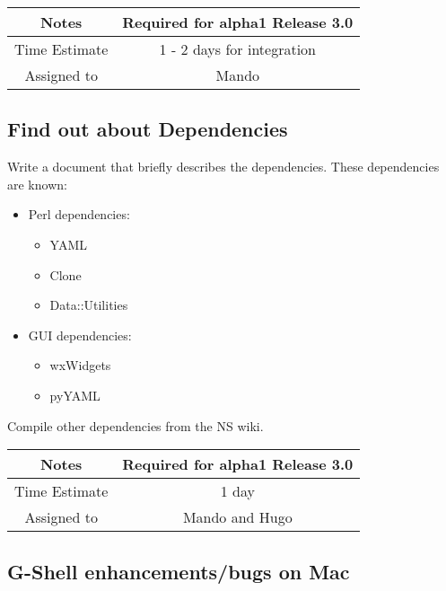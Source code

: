 \documentclass[12pt]{article}
\begin{document}
{
  \vspace{5mm}
  \centering
  \begin{tabular}{|c|c|}
    \hline
    Notes
    & Required for alpha1 Release 3.0 \\
    \hline
    Time Estimate
    & 1 - 2 days for integration \\
    \hline
    Assigned to
    & Mando \\
    \hline
  \end{tabular}
}


\subsection{Find out about Dependencies}

Write a document that briefly describes the dependencies.  These
dependencies are known:
\begin{itemize}
\item Perl dependencies:
  \begin{itemize}
  \item YAML
  \item Clone
  \item Data::Utilities
  \end{itemize}
\item GUI dependencies:
  \begin{itemize}
  \item wxWidgets
  \item pyYAML
  \end{itemize}
\end{itemize}

Compile other dependencies from the NS wiki.

{
  \vspace{5mm}
  \centering
  \begin{tabular}{|c|c|}
    \hline
    Notes
    & Required for alpha1 Release 3.0 \\
    \hline
    Time Estimate
    & 1 day \\
    \hline
    Assigned to
    & Mando and Hugo \\
    \hline
  \end{tabular}
}


\subsection{G-Shell enhancements/bugs on Mac}
\end{document}
